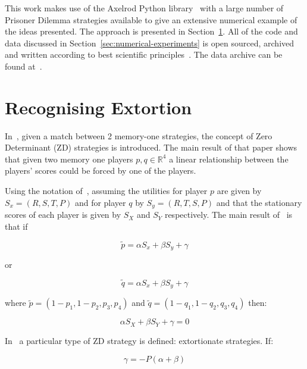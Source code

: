 \documentclass[a4paper]{article}
\begin{document}
This work makes use of the Axelrod Python library~\cite{Knight2018, Knight2016}
with a large number of Prisoner Dilemma strategies available to give an
extensive numerical example of the ideas presented.  The approach is presented
in Section~\ref{sec:delta-zd-strategies}.  All of the code and data discussed
in Section~\ref{sec:numerical-experiments} is open sourced, archived and
written according to best scientific principles~\cite{Wilson2014}. The data
archive can be found at~\cite{vincent_knight_2018_1297075}.

\section{Recognising Extortion}\label{sec:delta-zd-strategies}

In~\cite{Press2012}, given a match between 2 memory-one strategies, the concept
of Zero Determinant (ZD) strategies is introduced. The main result of that paper
shows that given two memory one players \(p, q\in\mathbb{R}^4\) a linear
relationship between the players' scores could be forced by one of the players.

Using the notation of~\cite{Press2012}, assuming the utilities for player \(p\)
are given by \(S_x=(R, S, T, P)\) and for player \(q\) by \(S_y=(R, T, S, P)\)
and that the stationary scores of each player is given by \(S_X\) and \(S_Y\)
respectively. The main result of~\cite{Press2012} is that if

\begin{equation}\label{eqn:linear_relationship_for_p}
    \tilde p=\alpha S_x + \beta S_y + \gamma
\end{equation}

or

\begin{equation}\label{eqn:linear_relationship_for_q}
    \tilde q=\alpha S_x + \beta S_y + \gamma
\end{equation}

where \(\tilde p = (1 - p_1, 1 - p_2, p_3, p_4)\) and
\(\tilde q = (1 - q_1, 1 - q_2, q_3, q_4)\) then:

\begin{equation}
    \alpha S_X + \beta S_Y + \gamma = 0
\end{equation}

In~\cite{Press2012} a particular type of ZD strategy is defined: extortionate
strategies. If:

\begin{equation}\label{eqn:constraint_for_extortion}
    \gamma = - P(\alpha + \beta)
\end{equation}
\end{document}
